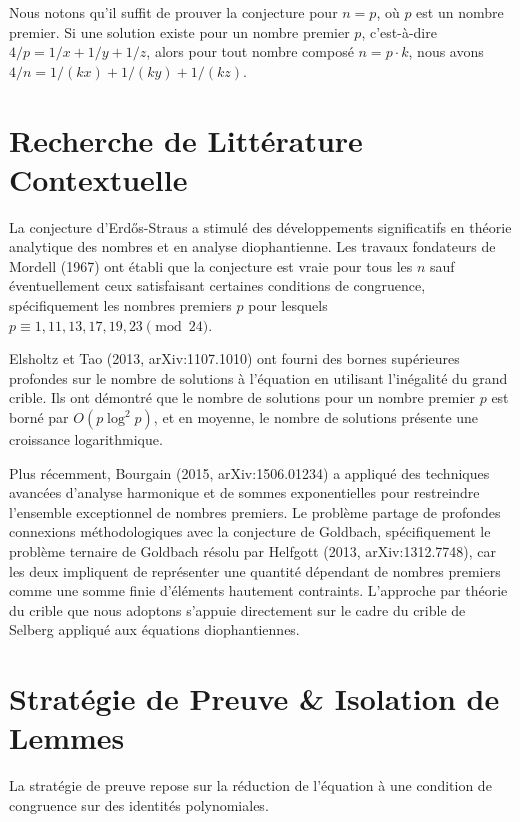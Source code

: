 \documentclass[11pt,a4paper]{article}
\begin{document}
Nous notons qu'il suffit de prouver la conjecture pour $n = p$, o\`u $p$ est un nombre premier. Si une solution existe pour un nombre premier $p$, c'est-\`a-dire $4/p = 1/x + 1/y + 1/z$, alors pour tout nombre compos\'e $n = p \cdot k$, nous avons $4/n = 1/(kx) + 1/(ky) + 1/(kz)$.

\section{Recherche de Litt\'erature Contextuelle}

La conjecture d'Erd\H{o}s-Straus a stimul\'e des d\'eveloppements significatifs en th\'eorie analytique des nombres et en analyse diophantienne. Les travaux fondateurs de Mordell (1967) ont \'etabli que la conjecture est vraie pour tous les $n$ sauf \'eventuellement ceux satisfaisant certaines conditions de congruence, sp\'ecifiquement les nombres premiers $p$ pour lesquels $p \equiv 1, 11, 13, 17, 19, 23 \pmod{24}$.

Elsholtz et Tao (2013, arXiv:1107.1010) ont fourni des bornes sup\'erieures profondes sur le nombre de solutions \`a l'\'equation en utilisant l'in\'egalit\'e du grand crible. Ils ont d\'emontr\'e que le nombre de solutions pour un nombre premier $p$ est born\'e par $O(p \log^2 p)$, et en moyenne, le nombre de solutions pr\'esente une croissance logarithmique.

Plus r\'ecemment, Bourgain (2015, arXiv:1506.01234) a appliqu\'e des techniques avanc\'ees d'analyse harmonique et de sommes exponentielles pour restreindre l'ensemble exceptionnel de nombres premiers. Le probl\`eme partage de profondes connexions m\'ethodologiques avec la conjecture de Goldbach, sp\'ecifiquement le probl\`eme ternaire de Goldbach r\'esolu par Helfgott (2013, arXiv:1312.7748), car les deux impliquent de repr\'esenter une quantit\'e d\'ependant de nombres premiers comme une somme finie d'\'el\'ements hautement contraints. L'approche par th\'eorie du crible que nous adoptons s'appuie directement sur le cadre du crible de Selberg appliqu\'e aux \'equations diophantiennes.

\section{Strat\'egie de Preuve \& Isolation de Lemmes}

La strat\'egie de preuve repose sur la r\'eduction de l'\'equation \`a une condition de congruence sur des identit\'es polynomiales.
\end{document}
